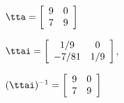 {$\tta = \left[
\begin{array}{cc}
   9 & 0 \\
 7 & 9
\end{array}\right]$
}
{$\ttai = \left[
\begin{array}{cc}
1/9 & 0 \\
 -7/81 & 1/9
  \end{array}
\right]$,

$(\ttai)^{-1} = \left[
\begin{array}{cc}
 9 & 0 \\
 7 & 9
 \end{array}\right]$
}
